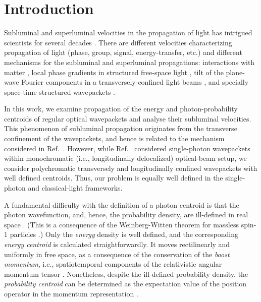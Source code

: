\documentclass[12pt, a4paper, superscriptaddress, final]{iopart}
\begin{document}
\section{Introduction}

Subluminal and superluminal velocities in the propagation of light has intrigued scientists for several decades \cite{Brillouin_book,Chiao1997,Winful2006,Boyd2002,Khurgin2010, Berry2010, Berry2012, Bliokh2013NJP_II, Asano2016, Giovannini2015}. There are different velocities characterizing propagation of light (phase, group, signal, energy-transfer, etc.) and different mechanisms for the subluminal and superluminal propagations: interactions with matter \cite{Chiao1997, Winful2006, Boyd2002, Khurgin2010, Asano2016}, local phase gradients in structured free-space light \cite{Berry2010, Berry2012, Bliokh2013NJP_II}, tilt of the plane-wave Fourier components in a transversely-confined light beams \cite{Giovannini2015}, and specially space-time structured wavepackets \cite{Yessenov2022}. 

In this work, we examine propagation of the energy and photon-probability centroids of regular optical wavepackets and analyse their subluminal velocities. 
This phenomenon of subluminal propagation originates from the transverse confinement of the wavepackets, and hence is related to the mechanism considered in Ref.~\cite{Giovannini2015}. However, while Ref.~\cite{Giovannini2015} considered single-photon wavepackets within monochromatic (i.e., longitudinally delocalized) optical-beam setup, we consider polychromatic transversely and longitudinally confined wavepackets with well defined centroids. Thus, our problem is equally well defined in the single-photon and classical-light frameworks.   

A fundamental difficulty with the definition of a photon centroid is that the photon wavefunction, and, hence, the probability density, are ill-defined in real space \cite{CT, BB1996}. (This is a consequence of the Weinberg-Witten theorem for massless spin-1 particles \cite{Weinberg1980}.) Only the {\it energy} density is well defined, and the corresponding {\it energy centroid} is calculated straightforwardly. It moves rectilinearly and uniformly in free space, as a consequence of the conservation of the {\it boost momentum}, i.e., spatiotemporal components of the relativistic angular momentum tensor \cite{LLfield,Bliokh2013NJP}. 
Nonetheless, despite the ill-defined probability density, the {\it probability centroid} can be determined as the expectation value of the position operator in the momentum representation \cite{Smirnova2018, Bliokh2023}. 
\end{document}
